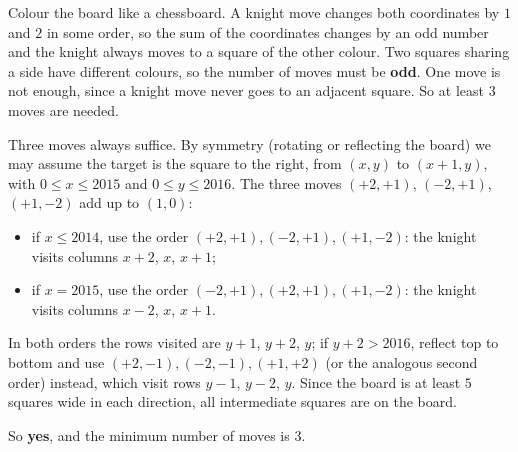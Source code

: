 Colour the board like a chessboard. A knight move changes both coordinates by $1$ and $2$ in some order, so the sum of the coordinates changes by an odd number and the knight always moves to a square of the other colour. Two squares sharing a side have different colours, so the number of moves must be \textbf{odd}. One move is not enough, since a knight move never goes to an adjacent square. So at least $3$ moves are needed.

Three moves always suffice. By symmetry (rotating or reflecting the board) we may assume the target is the square to the right, from $(x,y)$ to $(x+1,y)$, with $0\le x\le2015$ and $0\le y\le2016$. The three moves $(+2,+1)$, $(-2,+1)$, $(+1,-2)$ add up to $(1,0)$:
\begin{itemize}
\item if $x\le2014$, use the order $(+2,+1),(-2,+1),(+1,-2)$: the knight visits columns $x+2$, $x$, $x+1$;
\item if $x=2015$, use the order $(-2,+1),(+2,+1),(+1,-2)$: the knight visits columns $x-2$, $x$, $x+1$.
\end{itemize}
In both orders the rows visited are $y+1$, $y+2$, $y$; if $y+2>2016$, reflect top to bottom and use $(+2,-1),(-2,-1),(+1,+2)$ (or the analogous second order) instead, which visit rows $y-1$, $y-2$, $y$. Since the board is at least $5$ squares wide in each direction, all intermediate squares are on the board.

So \textbf{yes}, and the minimum number of moves is $\boxed{3}$.
